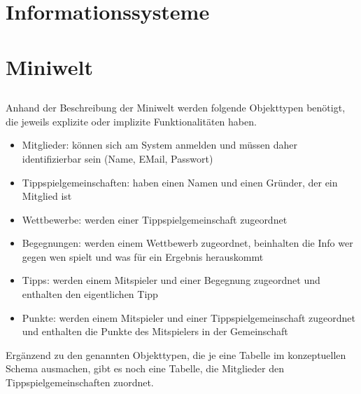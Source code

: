 \documentclass[ngerman]{gdb-aufgabenblatt}
\begin{document}
\section{Informationssysteme}
	\subsection{} %
	\subsection{} %
	\subsection{} %

\section{Miniwelt}
	\subsection{} %
		Anhand der Beschreibung der Miniwelt werden folgende Objekttypen benötigt, die jeweils explizite oder implizite Funktionalitäten haben.
		
		\begin{itemize}
			\item	Mitglieder: können sich am System anmelden und müssen daher identifizierbar sein (Name, EMail, Passwort)
			\item	Tippspielgemeinschaften: haben einen Namen und einen Gründer, der ein Mitglied ist
			\item	Wettbewerbe: werden einer Tippspielgemeinschaft zugeordnet
			\item	Begegnungen: werden einem Wettbewerb zugeordnet, beinhalten die Info wer gegen wen spielt und was für ein Ergebnis herauskommt
			\item	Tipps: werden einem Mitspieler und einer Begegnung zugeordnet und enthalten den eigentlichen Tipp
			\item	Punkte: werden einem Mitspieler und einer Tippspielgemeinschaft zugeordnet und enthalten die Punkte des Mitspielers in der Gemeinschaft
		\end{itemize}
		Ergänzend zu den genannten Objekttypen, die je eine Tabelle im konzeptuellen Schema ausmachen, gibt es noch eine Tabelle, die Mitglieder den Tippspielgemeinschaften zuordnet.
		
\end{document}
